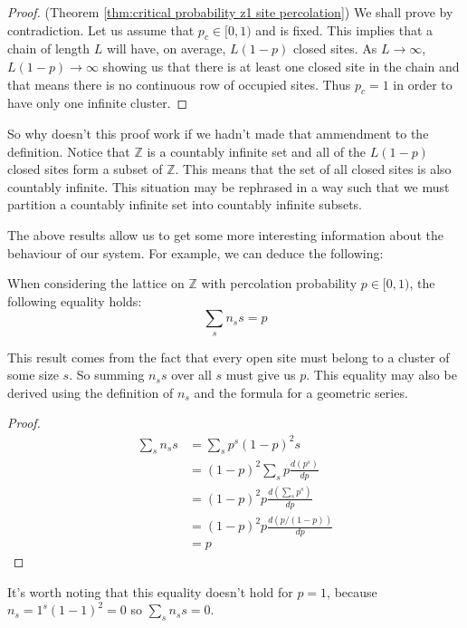 \begin{proof}{(Theorem \ref{thm:critical probability z1 site percolation})}
  We shall prove by contradiction. Let us assume that $p_c \in [0, 1)$ and is fixed. This implies that a chain of length $L$ will have, on average, $L(1-p)$ closed sites. As $L
  \rightarrow \infty$, $L(1-p) \rightarrow \infty$ showing us that there is at least one closed site in the chain and that means there is no continuous row of occupied
  sites. Thus $p_c=1$ in order to have only one infinite cluster.
\end{proof}

So why doesn't this proof work if we hadn't made that ammendment to the definition. Notice that $\mathbb{Z}$ is a countably infinite set and all of the $L(1-p)$ closed sites form a
subset of $\mathbb{Z}$. This means that the set of all closed sites is also countably infinite. This situation may be rephrased in a way such that we must partition a countably infinite set into
countably infinite subsets. 

The above results allow us to get some more interesting information about the behaviour of our system. For example, we can deduce the following:
\begin{corollary}
  When considering the lattice on $\mathbb{Z}$ with percolation probability $p \in [0, 1)$, the following equality holds:
  $$\sum_sn_ss = p$$
\end{corollary}
This result comes from the fact that every open site must belong to a cluster of some size $s$. So summing $n_ss$ over all $s$ must give us $p$. This equality may also be derived
using the definition of $n_s$ and the formula for a geometric series.

\begin{proof}
  \begin{align*}
    \sum_sn_ss &= \sum_sp^s(1-p)^2s \\
    &= (1-p)^2\sum_sp\frac{d(p^s)}{dp} \\
    &= (1-p)^2p\frac{d(\sum_sp^s)}{dp} \\
    &= (1-p)^2p\frac{d(p/(1-p))}{dp} \\
    &= p
  \end{align*}
\end{proof}

It's worth noting that this equality doesn't hold for $p=1$, because $n_s=1^s(1-1)^2=0$ so $\sum_sn_ss = 0$.
